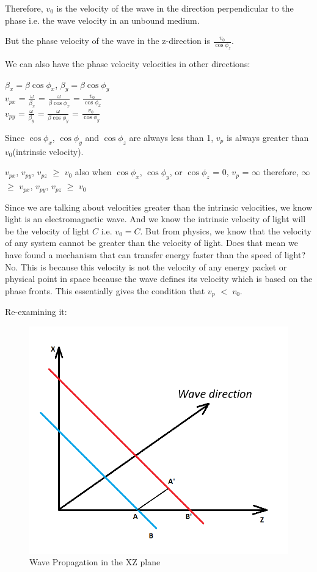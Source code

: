 Therefore, $v_0$ is the velocity of the wave in the direction perpendicular to the phase i.e. the wave velocity in an unbound medium.

But the phase velocity of the wave in the z-direction is $\frac{v_0}{\cos\phi_{z}}$.

We can also have the phase velocity velocities in other directions:
\begin{center}
$\beta_x = \beta\cos\phi_{x}$, $\beta_y = \beta\cos\phi_{y}$\\
$v_{px}$ = $\frac{\omega}{\beta_x}$ = $\frac{\omega}{\beta\cos\phi_{x}}$ = $\frac{v_0}{\cos\phi_{x}}$\\
$v_{py}$ = $\frac{\omega}{\beta_y}$ = $\frac{\omega}{\beta\cos\phi_{y}}$ = $\frac{v_0}{\cos\phi_{y}}$
\end{center}
Since $\cos\phi_{x}$, $\cos\phi_{y}$ and $\cos\phi_{z}$ are always less than 1, $v_p$ is always greater than $v_0$(intrinsic velocity).
\begin{center}
$v_{px}$, $v_{py}$, $v_{pz}$ $\geq$ $v_0$
also when $\cos\phi_{x}$, $\cos\phi_{y}$, or $\cos\phi_{z}$ = 0, $v_p$ = $\infty$
therefore, $\infty$ $\geq$ $v_{px}$, $v_{py}$, $v_{pz}$ $\geq$ $v_0$
\end{center}
Since we are talking about velocities greater than the intrinsic velocities, we know light is an electromagnetic wave. And we know the intrinsic velocity of light will be the velocity of light $C$ i.e. $v_0 = C$.
But from physics, we know that the velocity of any system cannot be greater than the velocity of light.
Does that mean we have found a mechanism that can transfer energy faster than the speed of light?
No. This is because this velocity is not the velocity of any energy packet or physical point in space because the wave defines its velocity which is based on the phase fronts. This essentially gives the condition that $v_p$ $<$ $v_0$.

Re-examining it:
\begin{figure}[h]
\centering
\includegraphics[width=.7\linewidth]{graphics/phase_velocity_of_wave}
\caption{Wave Propagation in the XZ plane}
\label{fig:wave_with_constant_wave_fonts_in_xy_plane}
\end{figure}

